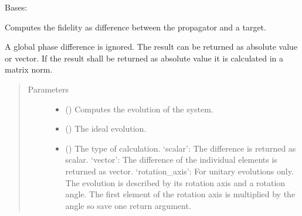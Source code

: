 \documentclass[letterpaper,10pt,english]{sphinxmanual}
\begin{document}

\begin{fulllineitems}
\label{\detokenize{qsim:qsim.cost_functions.OperatorMatrixNorm}}
Bases: {\hyperref[\detokenize{qsim:qsim.cost_functions.CostFunction}]{}}

Computes the fidelity as difference between the propagator and a target.

A global phase difference is ignored. The result can be returned as
absolute value or vector. If the result shall be returned as absolute value
it is calculated in a matrix norm.
\begin{quote}\begin{description}
\item[{Parameters}] \leavevmode\begin{itemize}
\item {} 
 () \textendash{} Computes the evolution of the system.

\item {} 
 () \textendash{} The ideal evolution.

\item {} 
 () \textendash{} The type of calculation.
‘scalar’: The difference is returned as scalar.
‘vector’: The difference of the individual elements is returned as
vector.
‘rotation\_axis’: For unitary evolutions only. The evolution is described
by its rotation axis and a rotation angle. The first element of the
rotation axis is multiplied by the angle so save one return argument.


\end{itemize}
\end{description}
\end{quote}
\end{fulllineitems}
\end{document}
